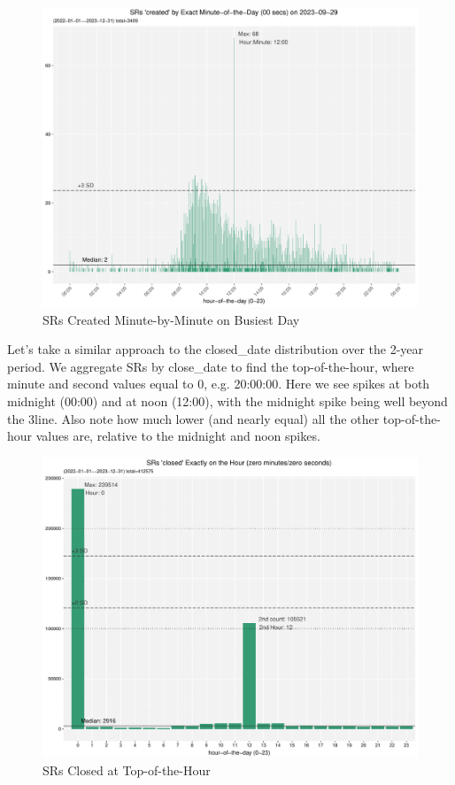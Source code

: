 \documentclass[12pt, titlepage]{article}
\begin{document}
	\begin{figure}[tbp]
		\centering
		\includegraphics[width=\textwidth]
		{2-year-trend-SR_created_by_minute_of_busiest_day.pdf}
		\caption{SRs Created Minute-by-Minute on Busiest Day}
		\label{fig:busiestcreated}
	\end{figure}	

	Let's take a similar approach to the closed\_date distribution over the 
	2-year period. We aggregate SRs by close\_date to find the top-of-the-hour, 
	where minute and second values equal to 0, e.g. 20:00:00. Here we see 
	spikes at both midnight (00:00) and at noon (12:00), with the midnight 
	spike being well beyond the 3\textsigma line. Also note how much lower 
	(and nearly equal) all the other top-of-the-hour values are, 
	relative to the midnight and noon spikes. 
	
	\begin{figure}[tbp]
		\centering
		\includegraphics[width = \textwidth]
		{2-year-trend-SR_closed_by_top_of_hour.pdf}
		\caption{SRs Closed at Top-of-the-Hour}
		\label{fig:tophourclosed}
	\end{figure}
	
\end{document}

